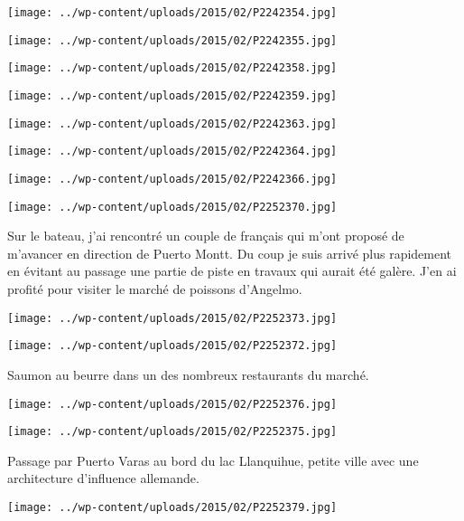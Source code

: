  \newline
\centerline{\texttt{[image: ../wp-content/uploads/2015/02/P2242354.jpg]} } 
\newline
\centerline{\texttt{[image: ../wp-content/uploads/2015/02/P2242355.jpg]} } 
 \newline
\centerline{\texttt{[image: ../wp-content/uploads/2015/02/P2242358.jpg]} } 
 \newline
\centerline{\texttt{[image: ../wp-content/uploads/2015/02/P2242359.jpg]} } 
 \newline
\centerline{\texttt{[image: ../wp-content/uploads/2015/02/P2242363.jpg]} } 
 \newline
\centerline{\texttt{[image: ../wp-content/uploads/2015/02/P2242364.jpg]} } 
 \newline
\centerline{\texttt{[image: ../wp-content/uploads/2015/02/P2242366.jpg]} } 
 \newline
\centerline{\texttt{[image: ../wp-content/uploads/2015/02/P2252370.jpg]} } 
Sur le bateau, j'ai rencontré un couple de français qui m'ont proposé de m'avancer en direction de Puerto Montt. Du coup je suis arrivé plus rapidement en évitant au passage une partie de piste en travaux qui aurait été galère. \newline
 J'en ai profité pour visiter le marché de poissons d'Angelmo. \newline
 \newline
\centerline{\texttt{[image: ../wp-content/uploads/2015/02/P2252373.jpg]} } 
 \newline
\centerline{\texttt{[image: ../wp-content/uploads/2015/02/P2252372.jpg]} } 
 \newline
 Saumon au beurre dans un des nombreux restaurants du marché. \newline
 \newline
\centerline{\texttt{[image: ../wp-content/uploads/2015/02/P2252376.jpg]} } 
 \newline
\centerline{\texttt{[image: ../wp-content/uploads/2015/02/P2252375.jpg]} } 
 \newline
 Passage par Puerto Varas au bord du lac Llanquihue, petite ville avec une architecture d'influence allemande. \newline
 \newline
\centerline{\texttt{[image: ../wp-content/uploads/2015/02/P2252379.jpg]} } 
 \newline

